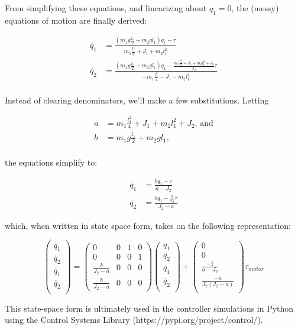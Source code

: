 \documentclass[12pt]{article}
\begin{document}
From simplifying these equations, and linearizing about $q_1 = 0$, the (messy) equations of motion are finally derived:


\begin{align*}
	\ddot{q_1} &= \frac{(m_1 g \frac{l_1}{2} + m_2 g l_1)q_1 - \tau}{m_1 \frac{l_1^2}{4} + J_1 + m_2 l_1^2} \\
	\ddot{q_2} &= \frac{(m_1 g \frac{l_1}{2} + m_2 g l_1)q_1 - \frac{m_1\frac{l_1^2}{4} + J_1 + m_2 l_1^2 + J_2}{J_2}\tau}{-m_1 \frac{l_1^2}{4} - J_1 - m_2 l_1^2} \\
\end{align*}

Instead of clearing denominators, we'll make a few substitutions.  Letting

\begin{align*}
	a &= m_1 \frac{l_1^2}{4} + J_1 + m_2 l_1^2 + J_2, \,\text{and} \\
	b &= m_1 g \frac{l_1}{2} + m_2 g l_1, \\
\end{align*}

the equations simplify to:

\begin{align*}
	\ddot{q_1} &= \frac{b q_1 - \tau}{a-J_2} \\
	\ddot{q_2} &= \frac{b q_1 - \frac{a}{J_2} \tau}{J_2 - a}
\end{align*}

which, when written in state space form, takes on the following representation:

\begin{equation*}
\begin{pmatrix} 
\dot{q_1}  \\
\dot{q_2} \\
\ddot{q_1} \\
\ddot{q_2} \\ 
\end{pmatrix}
= 
\begin{pmatrix}
0 & 0 & 1 & 0 \\
0 & 0 & 0 & 1 \\
\frac{b}{J_2-a} & 0 & 0 & 0 \\
\frac{b}{J_2 - a} & 0 & 0 & 0
\end{pmatrix}
\begin{pmatrix} 
q_1  \\
q_2 \\
\dot{q_1} \\
\dot{q_2} \\ 
\end{pmatrix}
+ 
\begin{pmatrix}
0 \\
0 \\
\frac{-1}{a-J_2} \\
\frac{-a}{J_2(J_2 - a)}\\
\end{pmatrix}
\tau_{motor}
\end{equation*}
\bigskip

This state-space form is ultimately used in the controller simulations in Python using the Control Systems Library (https://pypi.org/project/control/).
\end{document}
